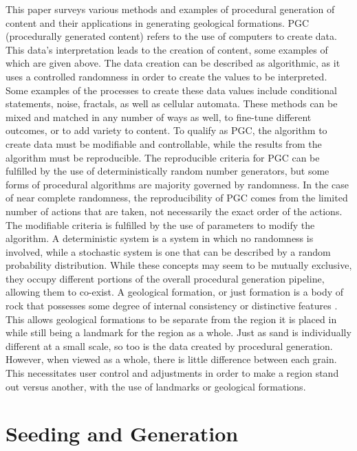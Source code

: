 \documentclass[10pt]{report}
\begin{document}
		This paper surveys various methods and examples of procedural generation of content and their applications in generating geological formations. PGC (procedurally generated content) refers to the use of computers to create data. This data's interpretation leads to the creation of content, some examples of which are given above. The data creation can be described as algorithmic, as it uses a controlled randomness in order to create the values to be interpreted. Some examples of the processes to create these data values include conditional statements, noise, fractals, as well as cellular automata. These methods can be mixed and matched in any number of ways as well, to fine-tune different outcomes, or to add variety to content. To qualify as PGC, the algorithm to create data must be modifiable and controllable, while the results from the algorithm must be reproducible. The reproducible criteria for PGC can be fulfilled by the use of deterministically random number generators, but some forms of procedural algorithms are majority governed by randomness. In the case of near complete randomness, the reproducibility of PGC comes from the limited number of actions that are taken, not necessarily the exact order of the actions. The modifiable criteria is fulfilled by the use of parameters to modify the algorithm. A deterministic system is a system in which no randomness is involved, while a stochastic system is one that can be described by a random probability distribution. While these concepts may seem to be mutually exclusive, they occupy different portions of the overall procedural generation pipeline, allowing them to co-exist. A geological formation, or just formation is a body of rock that possesses some degree of internal consistency or distinctive features \cite{2005}. This allows geological formations to be separate from the region it is placed in while still being a landmark for the region as a whole. Just as sand is individually different at a small scale, so too is the data created by procedural generation. However, when viewed as a whole, there is little difference between each grain. This necessitates user control and adjustments in order to make a region stand out versus another, with the use of landmarks or geological formations.
		
		\section{Seeding and Generation}
		
\end{document}
